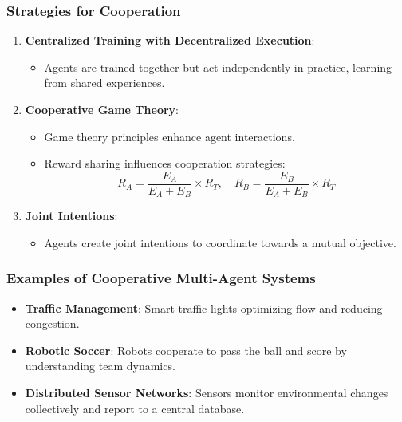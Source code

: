 \documentclass[aspectratio=169]{beamer}
\begin{document}
\begin{frame}[fragile]
    \frametitle{Strategies for Cooperation}
    \begin{enumerate}
        \item \textbf{Centralized Training with Decentralized Execution}:
            \begin{itemize}
                \item Agents are trained together but act independently in practice, learning from shared experiences.
            \end{itemize}
        
        \item \textbf{Cooperative Game Theory}:
            \begin{itemize}
                \item Game theory principles enhance agent interactions.
                \item Reward sharing influences cooperation strategies:
                \begin{equation}
                    R_A = \frac{E_A}{E_A + E_B} \times R_T, \quad R_B = \frac{E_B}{E_A + E_B} \times R_T
                \end{equation}
            \end{itemize}
        
        \item \textbf{Joint Intentions}:
            \begin{itemize}
                \item Agents create joint intentions to coordinate towards a mutual objective.
            \end{itemize}
    \end{enumerate}
\end{frame}

\begin{frame}[fragile]
    \frametitle{Examples of Cooperative Multi-Agent Systems}
    \begin{itemize}
        \item \textbf{Traffic Management}: Smart traffic lights optimizing flow and reducing congestion.
        \item \textbf{Robotic Soccer}: Robots cooperate to pass the ball and score by understanding team dynamics.
        \item \textbf{Distributed Sensor Networks}: Sensors monitor environmental changes collectively and report to a central database.
    \end{itemize}
\end{frame}
\end{document}
